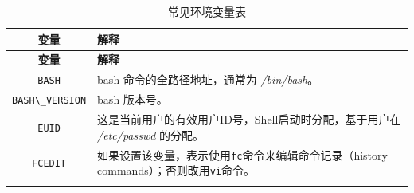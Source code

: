 \documentclass[doctor,openright,twoside]{sjtuthesis}
\newcommand{\passthrough}[1]{#1}
\theoremstyle{plain}
\theoremstyle{definition}
\theoremstyle{remark}
\theoremstyle{ocrenumbox}
\theoremstyle{plain}
\begin{document}
\begin{longtable}[]{@{}cl@{}}
\caption{常见环境变量表}\tabularnewline
\toprule
\begin{minipage}[b]{0.23\columnwidth}\centering
\textbf{变量}\strut
\end{minipage} & \begin{minipage}[b]{0.72\columnwidth}\raggedright
\textbf{解释}\strut
\end{minipage}\tabularnewline
\midrule
\endfirsthead
\toprule
\begin{minipage}[b]{0.23\columnwidth}\centering
\textbf{变量}\strut
\end{minipage} & \begin{minipage}[b]{0.72\columnwidth}\raggedright
\textbf{解释}\strut
\end{minipage}\tabularnewline
\midrule
\endhead
\begin{minipage}[t]{0.23\columnwidth}\centering
\passthrough{\lstinline!BASH!}\strut
\end{minipage} & \begin{minipage}[t]{0.72\columnwidth}\raggedright
bash 命令的全路径地址，通常为 \emph{/bin/bash}。\strut
\end{minipage}\tabularnewline
\begin{minipage}[t]{0.23\columnwidth}\centering
\passthrough{\lstinline!BASH\_VERSION!}\strut
\end{minipage} & \begin{minipage}[t]{0.72\columnwidth}\raggedright
bash 版本号。\strut
\end{minipage}\tabularnewline
\begin{minipage}[t]{0.23\columnwidth}\centering
\passthrough{\lstinline!EUID!}\strut
\end{minipage} & \begin{minipage}[t]{0.72\columnwidth}\raggedright
这是当前用户的有效用户ID号，Shell启动时分配，基于用户在 \emph{/etc/passwd} 的分配。\strut
\end{minipage}\tabularnewline
\begin{minipage}[t]{0.23\columnwidth}\centering
\passthrough{\lstinline!FCEDIT!}\strut
\end{minipage} & \begin{minipage}[t]{0.72\columnwidth}\raggedright
如果设置该变量，表示使用\passthrough{\lstinline!fc!}命令来编辑命令记录（history commands）；否则改用\passthrough{\lstinline!vi!}命令。\strut
\end{minipage}\tabularnewline
\begin{minipage}[t]{0.23\columnwidth}\centering

\end{minipage}
\end{longtable}
\end{document}
